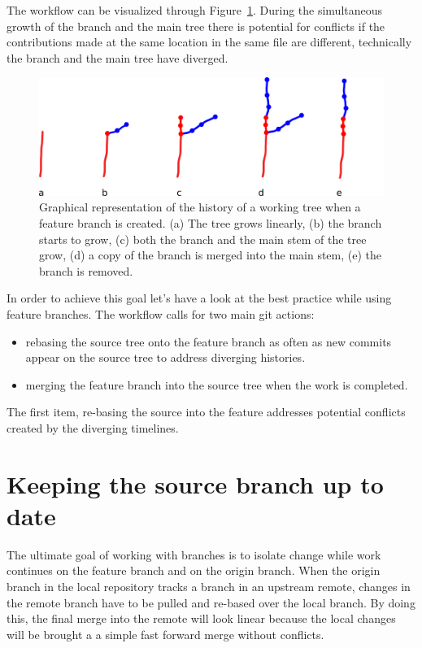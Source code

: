 \documentclass[10pt]{article}
\begin{document}
The workflow can be visualized through Figure~\ref{fig:feature-happy-path}. 
During the simultaneous growth of the branch and the main tree there is potential for conflicts if the contributions made at the same location in the same file are different, technically the branch and the main tree have diverged.

\begin{figure}
    \centering
    \includegraphics[width=\textwidth]{images/featurebranch_happy_path.png}
    \caption{Graphical representation of the history of a working tree when a feature branch is created. (a) The tree grows linearly, (b) the branch starts to grow, (c) both the branch and the main stem of the tree grow, (d) a copy of the branch is merged into the main stem, (e) the branch is removed.}
    \label{fig:feature-happy-path}
\end{figure}

In order to achieve this goal let's have a look at the best practice while using feature branches.
The workflow calls for two main git actions:

\begin{itemize}
    \item rebasing the source tree onto the feature branch as often as new commits appear on the source tree to address diverging histories.
    \item merging the feature branch into the source tree when the work is completed.
\end{itemize}

The first item, re-basing the source into the feature addresses potential conflicts created by the diverging timelines.

\section{Keeping the source branch up to date}

The ultimate goal of working with branches is to isolate change while work continues on the feature branch and on the origin branch.
When the origin branch in the local repository tracks a branch in an upstream remote, changes in the remote branch have to be pulled and re-based over the local branch.
By doing this, the final merge into the remote will look linear because the local changes will be brought a a simple  fast  forward merge without conflicts.
\end{document}
